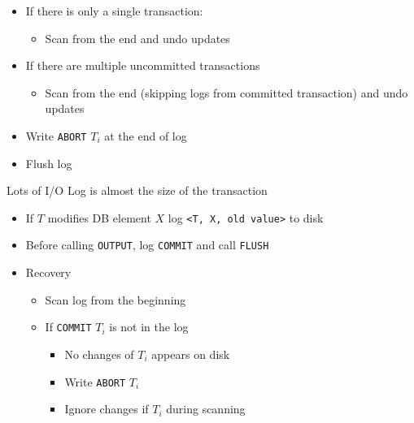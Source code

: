 \begin{itemize}
\begin{itemize}
\begin{itemize}
\begin{itemize}
\begin{itemize}
                                    \item If there is only a single transaction:
                                        \begin{itemize}
                                            \item Scan from the end and undo updates
                                        \end{itemize}
                                    \item If there are multiple uncommitted transactions
                                        \begin{itemize}
                                            \item Scan from the end (skipping logs from committed transaction) and undo updates
                                        \end{itemize}
                                    \item Write \verb+ABORT+ $T_i$ at the end of log
                                    \item Flush log
                                \end{itemize}
                        \end{itemize}
                \end{itemize}
            \icon Lots of I/O
            \icon Log is almost the size of the transaction
        \end{itemize}
        \begin{itemize}
            \item If $T$ modifies DB element $X$ log \verb+<T, X, old value>+ to disk
            \item Before calling \verb+OUTPUT+, log \verb+COMMIT+ and call \verb+FLUSH+
            \item Recovery
                \begin{itemize}
                    \item Scan log from the beginning
                    \item If \verb+COMMIT+ $T_i$ is not in the log
                        \begin{itemize}
                            \item No changes of $T_i$ appears on disk
                            \item Write \verb+ABORT+ $T_i$
                            \item Ignore changes if $T_i$ during scanning

\end{itemize}
\end{itemize}
\end{itemize}
\end{itemize}
